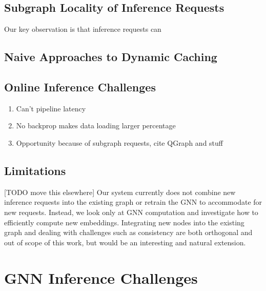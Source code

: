 \subsection{Subgraph Locality of Inference Requests}
Our key observation is that inference requests can 

\subsection{Naive Approaches to Dynamic Caching}


    

    




\subsection{Online Inference Challenges}
\begin{enumerate}
    \item Can't pipeline latency
    \item No backprop makes data loading larger percentage
    \item Opportunity because of subgraph requests, cite QGraph and stuff
\end{enumerate}

\subsection{Limitations}
[TODO move this elsewhere]
Our system currently does not combine new inference requests into the existing graph or retrain the GNN to accommodate for new requests. 
Instead, we look only at GNN computation and investigate how to efficiently compute new embeddings. 
Integrating new nodes into the existing graph and dealing with challenges such as consistency are both orthogonal and out of scope of this work, but would be an interesting and natural extension.

\section{GNN Inference Challenges}
